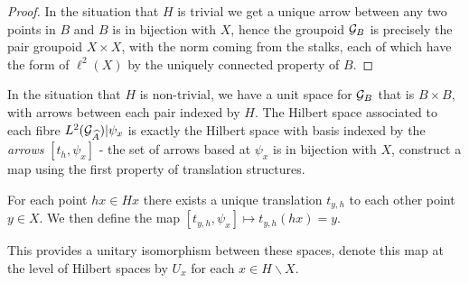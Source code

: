 \begin{corollary}
\begin{proof}
In the situation that $H$ is trivial we get a unique arrow between any two points in $B$ and $B$ is in bijection with $X$, hence the groupoid $\mathcal{G}_{B}$ is precisely the pair groupoid $X \times X$, with the norm coming from the stalks, each of which have the form of $\ell^{2}(X)$ by the uniquely connected property of $B$.
\end{proof}

\begin{remark}
In the situation that $H$ is non-trivial, we have a unit space for $\mathcal{G}_{B}$ that is $B\times B$, with arrows between each pair indexed by $H$. The Hilbert space associated to each fibre $L^{2}(\mathcal{G}_{\widehat{A}})|\psi_{x}$ is exactly the Hilbert space with basis indexed by the \textit{arrows} $[t_{h},\psi_{x}]$ - the set of arrows based at $\psi_{x}$ is in bijection with $X$, construct a map using the first property of translation structures.

For each point $hx \in Hx$ there exists a unique translation $t_{y,h}$ to each other point $y \in X$. We then define the map $[t_{y,h}, \psi_{x}] \mapsto t_{y,h}(hx)=y$.

This provides a unitary isomorphism between these spaces, denote this map at the level of Hilbert spaces by $U_{x}$ for each $x \in H \backslash X$.
\end{remark}

\end{corollary}
